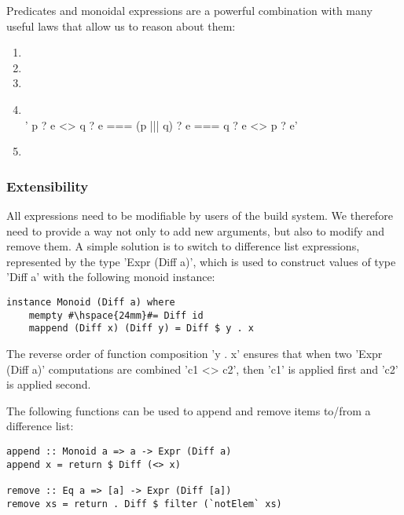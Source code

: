 \noindent Predicates and monoidal expressions are a powerful combination with
many useful laws that allow us to reason about them:
\begin{enumerate}
  \item {} 
  \item {} 
  \item {} 
  \item {}  \vspace{1mm}\\
  \lst'    p ? e <> q ? e === (p ||| q) ? e === q ? e <> p ? e'
  \item {} 
\end{enumerate}

\subsubsection{Extensibility}

All expressions need to be modifiable by users of the build system. We therefore
need to provide a way not only to add new arguments, but also
to modify and remove them. A simple solution is to switch to difference
list expressions, represented by the type \lst'Expr (Diff a)', which is used to
construct values of type \lst'Diff a' with the following monoid instance:

\begin{lstlisting}
instance Monoid (Diff a) where
    mempty #\hspace{24mm}#= Diff id
    mappend (Diff x) (Diff y) = Diff $ y . x
\end{lstlisting}

\noindent The reverse order of function composition \lst'y . x' ensures that
when two \lst'Expr (Diff a)' computations are combined \lst'c1 <> c2', then
\lst'c1' is applied first and \lst'c2' is applied second.

The following functions can be used to append and remove items to/from a
difference list:

\begin{lstlisting}
append :: Monoid a => a -> Expr (Diff a)
append x = return $ Diff (<> x)

remove :: Eq a => [a] -> Expr (Diff [a])
remove xs = return . Diff $ filter (`notElem` xs)
\end{lstlisting}


